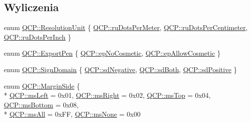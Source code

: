 \subsection*{Wyliczenia}
\begin{DoxyCompactItemize}
\item 
enum \hyperlink{namespace_q_c_p_a715d46153da230990aa887d0f0602452}{Q\+C\+P\+::\+Resolution\+Unit} \{ \hyperlink{namespace_q_c_p_a715d46153da230990aa887d0f0602452a707d005dea5c4ab694e4270d9c6094e8}{Q\+C\+P\+::ru\+Dots\+Per\+Meter}, 
\hyperlink{namespace_q_c_p_a715d46153da230990aa887d0f0602452a4224e01f49b331489ad8cb12b619b229}{Q\+C\+P\+::ru\+Dots\+Per\+Centimeter}, 
\hyperlink{namespace_q_c_p_a715d46153da230990aa887d0f0602452affb887d8efe79c39a1aca2acd7002afc}{Q\+C\+P\+::ru\+Dots\+Per\+Inch}
 \}
\item 
enum \hyperlink{namespace_q_c_p_a17844f19e1019693a953e1eb93536d2f}{Q\+C\+P\+::\+Export\+Pen} \{ \hyperlink{namespace_q_c_p_a17844f19e1019693a953e1eb93536d2faae8fcfaafee234ce18558afef83f6a78}{Q\+C\+P\+::ep\+No\+Cosmetic}, 
\hyperlink{namespace_q_c_p_a17844f19e1019693a953e1eb93536d2fa50d3657dba3fb90560b93a823cb0a6e8}{Q\+C\+P\+::ep\+Allow\+Cosmetic}
 \}
\item 
enum \hyperlink{namespace_q_c_p_afd50e7cf431af385614987d8553ff8a9}{Q\+C\+P\+::\+Sign\+Domain} \{ \hyperlink{namespace_q_c_p_afd50e7cf431af385614987d8553ff8a9a2d18af0bc58f6528d1e82ce699fe4829}{Q\+C\+P\+::sd\+Negative}, 
\hyperlink{namespace_q_c_p_afd50e7cf431af385614987d8553ff8a9aa38352ef02d51ddfa4399d9551566e24}{Q\+C\+P\+::sd\+Both}, 
\hyperlink{namespace_q_c_p_afd50e7cf431af385614987d8553ff8a9a584784b75fb816abcc627cf743bb699f}{Q\+C\+P\+::sd\+Positive}
 \}
\item 
enum \hyperlink{namespace_q_c_p_a7e487e3e2ccb62ab7771065bab7cae54}{Q\+C\+P\+::\+Margin\+Side} \{ \\*
\hyperlink{namespace_q_c_p_a7e487e3e2ccb62ab7771065bab7cae54a9500c8bfcc9e80b9dff0a8e00e867f07}{Q\+C\+P\+::ms\+Left} = 0x01, 
\hyperlink{namespace_q_c_p_a7e487e3e2ccb62ab7771065bab7cae54a93c719593bb2b94ed244d52c86d83b65}{Q\+C\+P\+::ms\+Right} = 0x02, 
\hyperlink{namespace_q_c_p_a7e487e3e2ccb62ab7771065bab7cae54a5db8fb0d0b0ecf0d611c2602a348e8a0}{Q\+C\+P\+::ms\+Top} = 0x04, 
\hyperlink{namespace_q_c_p_a7e487e3e2ccb62ab7771065bab7cae54a5241d8eac2bab9524a38889f576179cc}{Q\+C\+P\+::ms\+Bottom} = 0x08, 
\\*
\hyperlink{namespace_q_c_p_a7e487e3e2ccb62ab7771065bab7cae54a43d7361cb0c5244eabdc962021bffebc}{Q\+C\+P\+::ms\+All} = 0x\+FF, 
\hyperlink{namespace_q_c_p_a7e487e3e2ccb62ab7771065bab7cae54a80aa4149f16dabd538f8b2e3d42c42d5}{Q\+C\+P\+::ms\+None} = 0x00

\end{DoxyCompactItemize}
